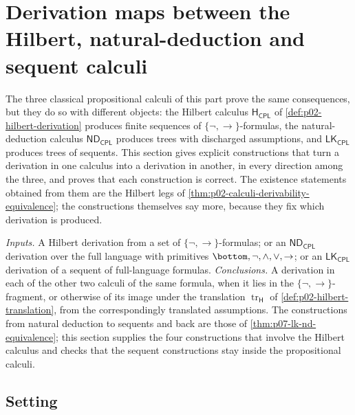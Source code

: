 \section{Derivation maps between the Hilbert, natural-deduction and sequent calculi}
\label{sec:p02-w02b-p02-010-translations}

The three classical propositional calculi of this part prove the same
consequences, but they do so with different objects: the Hilbert calculus
\(\mathsf H_{\mathsf{CPL}}\) of \cref{def:p02-hilbert-derivation} produces
finite sequences of \(\{\neg,\to\}\)-formulas, the natural-deduction calculus
\(\mathsf{ND}_{\mathsf{CPL}}\) produces trees with discharged assumptions,
and \(\mathsf{LK}_{\mathsf{CPL}}\) produces trees of sequents.  This section
gives explicit constructions that turn a derivation in one calculus into a
derivation in another, in every direction among the three, and proves that
each construction is correct.  The existence statements obtained from them
are the Hilbert legs of \cref{thm:p02-calculi-derivability-equivalence}; the
constructions themselves say more, because they fix which derivation is
produced.

\emph{Inputs.}  A Hilbert derivation from a set of \(\{\neg,\to\}\)-formulas;
or an \(\mathsf{ND}_{\mathsf{CPL}}\) derivation over the full language with
primitives \(\bottom,\neg,\land,\lor,\to\); or an \(\mathsf{LK}_{\mathsf{CPL}}\)
derivation of a sequent of full-language formulas.  \emph{Conclusions.}  A
derivation in each of the other two calculi of the same formula, when it
lies in the \(\{\neg,\to\}\)-fragment, or otherwise of its image under the
translation \(\operatorname{tr}_{\mathsf H}\) of
\cref{def:p02-hilbert-translation}, from the correspondingly translated
assumptions.  The constructions from natural deduction to sequents and back
are those of \cref{thm:p07-lk-nd-equivalence}; this section supplies the
four constructions that involve the Hilbert calculus and checks that the
sequent constructions stay inside the propositional calculi.

\subsection{Setting}
\label{sec:p02-w02b-p02-010-setting}


